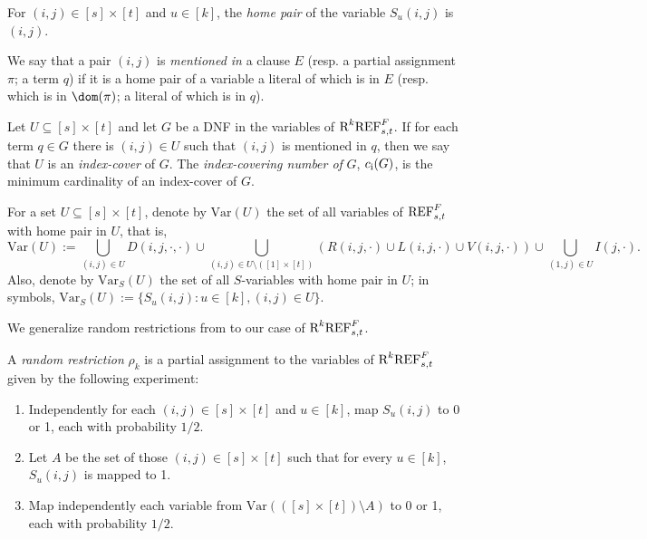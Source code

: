 \begin{definition}
For $(i,j) \in [s] \times [t]$ and $u \in [k]$, the \emph{home pair} of the variable $S_u(i,j)$ is $(i,j)$.

We say that a pair $(i,j)$ is \emph{mentioned in} a clause $E$ (resp. a partial assignment $\pi$; a term $q$) if it is a home pair of a variable a literal of which is in $E$ (resp. which is in $\dom(\pi)$; a literal of which is in $q$).
\end{definition}


\begin{definition}
Let $U \subseteq [s] \times [t]$ and let $G$ be a DNF in the variables of $\textnormal{R}^k\textnormal{REF}^{F}_{s,t}$. If for each term $q \in G$ there is $(i,j) \in U$ such that $(i,j)$ is mentioned in $q$, then we say that $U$ is an \emph{index-cover} of $G$. The \emph{index-covering number of} $G$, $c_{\textnormal{i}}(G)$, is the minimum cardinality of an index-cover of $G$.
\end{definition}

\begin{definition}
For a set $U \subseteq [s] \times [t]$, denote by $\text{Var}(U)$ the set of all variables of $\textnormal{REF}^{F}_{s,t}$ with home pair in $U$, that is, 
\[
 \text{Var}(U) := \bigcup_{(i,j) \in U} D(i,j,\cdot, \cdot) \cup \bigcup_{(i,j) \in U \setminus ([1] \times [t])} \left( R(i,j,\cdot) \cup L(i,j,\cdot) \cup V(i,j,\cdot) \right) \cup \bigcup_{(1,j) \in U} I(j,\cdot).
\]
Also, denote by $\text{Var}_S(U)$ the set of all $S$-variables with home pair in $U$; in symbols, $\text{Var}_S(U) := \{ S_u(i,j) : u \in [k], (i,j) \in U \}$.
\end{definition}

We generalize random restrictions from \cite{atserias-muller2019-focs} to our case of $\textnormal{R}^k\textnormal{REF}^{F}_{s,t}$.

\begin{definition}
\label{def:random_restriction}
A \emph{random restriction} $\rho_k$ is a partial assignment to the variables of $\textnormal{R}^k\textnormal{REF}^{F}_{s,t}$ given by the following experiment:
\begin{enumerate}
\item Independently for each $(i,j) \in [s] \times [t]$ and $u \in [k]$, map $S_u(i,j)$ to 0 or 1, each with probability $1/2$. 
\item Let $A$ be the set of those $(i,j) \in [s] \times [t]$ such that for every $u \in [k]$, $S_u(i,j)$ is mapped to 1.
\item Map independently each variable from $\text{Var}(([s] \times [t]) \setminus A)$ to 0 or 1, each with probability $1/2$.
\end{enumerate}
\end{definition}

